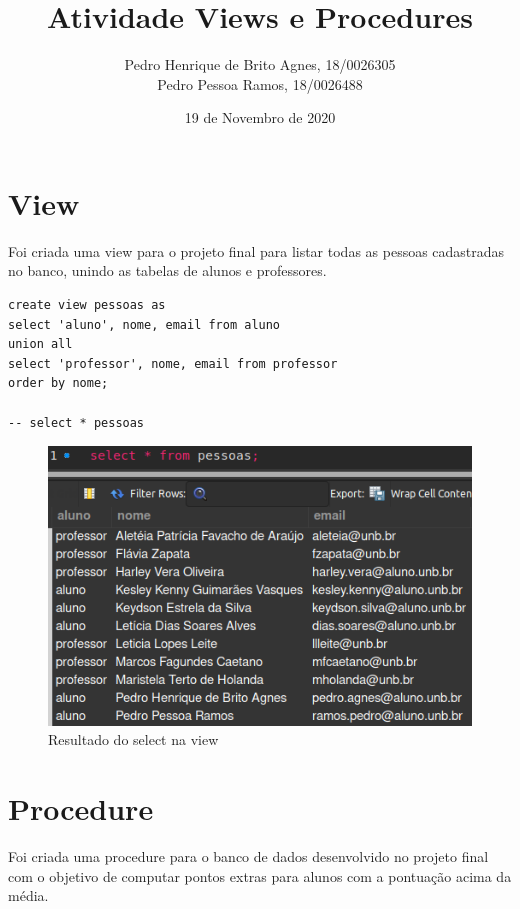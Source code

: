 \documentclass[12pt]{article}
\title{Atividade Views e Procedures}
\author{Pedro Henrique de Brito Agnes, 18/0026305 \\
Pedro Pessoa Ramos, 18/0026488}
\date{19 de Novembro de 2020}
\begin{document}
 
\maketitle

\section*{View}
Foi criada uma view para o projeto final para listar todas as pessoas cadastradas no banco, unindo as tabelas de alunos e professores.

\begin{lstlisting}
create view pessoas as
select 'aluno', nome, email from aluno
union all
select 'professor', nome, email from professor
order by nome;

-- select * pessoas
\end{lstlisting}

\begin{figure}[H]
	\centering
    \includegraphics[width=.8\textwidth]{pessoas.png}
    \caption{Resultado do select na view}
\end{figure}

\section*{Procedure}
Foi criada uma procedure para o banco de dados desenvolvido no projeto final com o objetivo de computar pontos extras para alunos com a pontuação acima da média.
\end{document}
